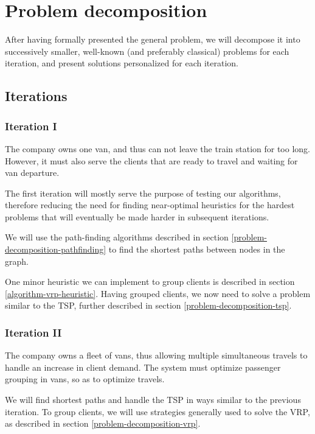 \chapter{Problem decomposition} \label{problem-decomposition}
After having formally presented the general problem, we will decompose it into successively smaller, well-known (and preferably classical) problems for each iteration, and present solutions personalized for each iteration.

\section{Iterations} \label{problem-decomposition-iterations}
\subsection{Iteration I}
The company owns one van, and thus can not leave the train station for too long. However, it must also serve the clients that are ready to travel and waiting for van departure.\par
The first iteration will mostly serve the purpose of testing our algorithms, therefore reducing the need for finding near-optimal heuristics for the hardest problems that will eventually be made harder in subsequent iterations.\par
We will use the path-finding algorithms described in section \ref{problem-decomposition-pathfinding} to find the shortest paths between nodes in the graph.\par
One minor heuristic we can implement to group clients is described in section \ref{algorithm-vrp-heuristic}. Having grouped clients, we now need to solve a problem similar to the \acrshort{TSP}, further described in section \ref{problem-decomposition-tsp}.
\subsection{Iteration II}
The company owns a fleet of vans, thus allowing multiple simultaneous travels to handle an increase in client demand. The system must optimize passenger grouping in vans, so as to optimize travels.\par
We will find shortest paths and handle the \acrshort{TSP} in ways similar to the previous iteration. To group clients, we will use strategies generally used to solve the \acrshort{VRP}, as described in section \ref{problem-decomposition-vrp}.
